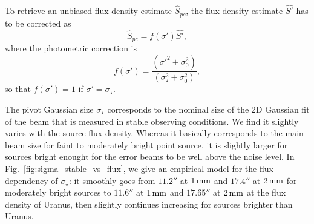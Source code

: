 To retrieve an unbiased flux density estimate $\hat{S}_{pc}$, the
flux density estimate $\hat{S'}$ has to be corrected as
\begin{equation}
  \hat{S}_{pc} = f(\sigma')\hat{S'},
\end{equation} 
where the photometric correction is 
\begin{equation}
  f(\sigma') = \frac{(\sigma'^2 + \sigma_0^2)}{(\sigma_\star^2+\sigma_0^2)}, 
\end{equation} 
so that $f(\sigma') = 1$ if $\sigma'=\sigma_\star$.

The pivot Gaussian size $\sigma_{\star}$ corresponds
to the nominal size of the 2D Gaussian fit of the beam that is
measured in stable observing conditions. We find it slightly varies with the
source flux density. Whereas it basically corresponds to the main beam
size for faint to moderately bright point source, it is slightly
larger for sources bright enought for the error beams to be well above
the noise level. In Fig.~\ref{fig:sigma_stable_vs_flux}, we give an
empirical model for the flux dependency of 
$\sigma_{\star}$: it
smoothly goes from $11.2''$ at $1\,\rm{mm}$ and $17.4''$ at $2\,\rm{mm}$ for
moderately bright sources to $11.6''$ at $1\,\rm{mm}$ and $17.65''$ at
$2\,\rm{mm}$ at the flux density of Uranus,
then slightly continues increasing for sources brighter than Uranus.
